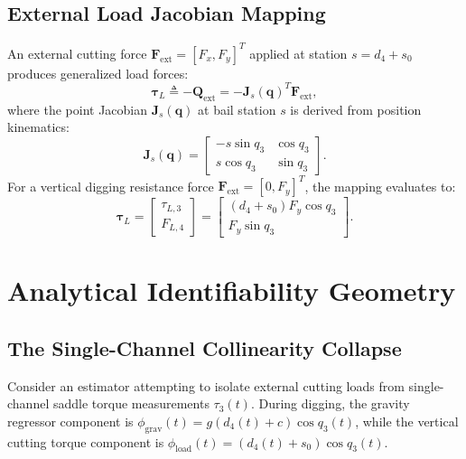\documentclass[journal]{IEEEtran}
\begin{document}
\subsection{External Load Jacobian Mapping}
An external cutting force $\bm{F}_{\mathrm{ext}} = [F_x, F_y]^T$ applied at station $s = d_4 + s_0$ produces generalized load forces:
\begin{equation}
\bm{\tau}_L \triangleq -\bm{Q}_{\mathrm{ext}} = -\bm{J}_s(\bm{q})^T \bm{F}_{\mathrm{ext}},
\end{equation}
where the point Jacobian $\bm{J}_s(\bm{q})$ at bail station $s$ is derived from position kinematics:
\begin{equation}
\bm{J}_s(\bm{q}) = \begin{bmatrix} -s\sin q_3 & \cos q_3 \\ s\cos q_3 & \sin q_3 \end{bmatrix}.
\end{equation}
For a vertical digging resistance force $\bm{F}_{\mathrm{ext}} = [0, F_y]^T$, the mapping evaluates to:
\begin{equation}
\bm{\tau}_L = \begin{bmatrix} \tau_{L,3} \\ F_{L,4} \end{bmatrix} = \begin{bmatrix} (d_4+s_0) F_y \cos q_3 \\ F_y \sin q_3 \end{bmatrix}.
\label{eq:load_mapping}
\end{equation}

\section{Analytical Identifiability Geometry}

\subsection{The Single-Channel Collinearity Collapse}
Consider an estimator attempting to isolate external cutting loads from single-channel saddle torque measurements $\tau_3(t)$. During digging, the gravity regressor component is $\phi_{\mathrm{grav}}(t) = g(d_4(t)+c)\cos q_3(t)$, while the vertical cutting torque component is $\phi_{\mathrm{load}}(t) = (d_4(t)+s_0)\cos q_3(t)$.
\end{document}
